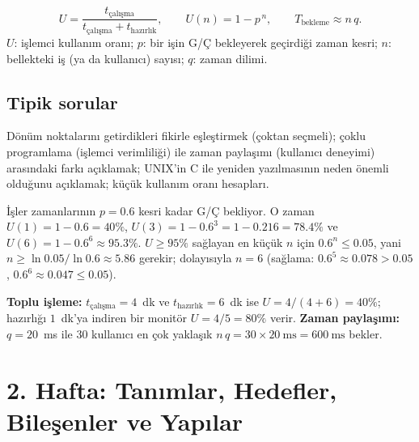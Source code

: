 \begin{keyidea}
\[
U = \frac{t_{\text{çalışma}}}{t_{\text{çalışma}} + t_{\text{hazırlık}}}, \qquad
U(n) = 1 - p^{\,n}, \qquad
T_{\text{bekleme}} \approx n\,q .
\]
$U$: işlemci kullanım oranı; $p$: bir işin G/Ç bekleyerek geçirdiği zaman kesri; $n$: bellekteki iş (ya da kullanıcı) sayısı; $q$: zaman dilimi.
\end{keyidea}

\subsection*{Tipik sorular}
Dönüm noktalarını getirdikleri fikirle eşleştirmek (çoktan seçmeli); çoklu programlama (işlemci verimliliği) ile zaman paylaşımı (kullanıcı deneyimi) arasındaki farkı açıklamak; UNIX'in C ile yeniden yazılmasının neden önemli olduğunu açıklamak; küçük kullanım oranı hesapları.

\begin{example}
İşler zamanlarının $p = 0.6$ kesri kadar G/Ç bekliyor. O zaman $U(1) = 1 - 0.6 = 40\%$, $U(3) = 1 - 0.6^{3} = 1 - 0.216 = 78.4\%$ ve $U(6) = 1 - 0.6^{6} \approx 95.3\%$. $U \ge 95\%$ sağlayan en küçük $n$ için $0.6^{n} \le 0.05$, yani $n \ge \ln 0.05 / \ln 0.6 \approx 5.86$ gerekir; dolayısıyla $n = 6$ (sağlama: $0.6^{5} \approx 0.078 > 0.05$, $0.6^{6} \approx 0.047 \le 0.05$).

\textbf{Toplu işleme:} $t_{\text{çalışma}} = 4$~dk ve $t_{\text{hazırlık}} = 6$~dk ise $U = 4/(4+6) = 40\%$; hazırlığı $1$~dk'ya indiren bir monitör $U = 4/5 = 80\%$ verir. \textbf{Zaman paylaşımı:} $q = 20$~ms ile $30$ kullanıcı en çok yaklaşık $n\,q = 30 \times 20\ \text{ms} = 600\ \text{ms}$ bekler.
\end{example}

\section{2. Hafta: Tanımlar, Hedefler, Bileşenler ve Yapılar}
\label{sec:w2}

